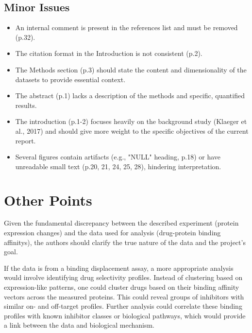 \documentclass[11pt, a4paper]{article}
\begin{document}
\subsection{Minor Issues}

\begin{itemize}
    \item An internal comment is present in the references list and must be removed (p.32).
    
    \item The citation format in the Introduction is not consistent (p.2).
    
    \item The Methods section (p.3) should state the content and dimensionality of the datasets to provide essential context.
    
    \item The abstract (p.1) lacks a description of the methods and specific, quantified results.
    
    \item The introduction (p.1-2) focuses heavily on the background study (Klaeger et al., 2017) and should give more weight to the specific objectives of the current report.
    
    \item Several figures contain artifacts (e.g., "NULL" heading, p.18) or have unreadable small text (p.20, 21, 24, 25, 28), hindering interpretation.
\end{itemize}

\section{Other Points}

Given the fundamental discrepancy between the described experiment (protein expression changes) and the data used for analysis (drug-protein binding affinitys), the authors should clarify the true nature of the data and the project's goal.

If the data is from a binding displacement assay, a more appropriate analysis would involve identifying drug selectivity profiles. Instead of clustering based on expression-like patterns, one could cluster drugs based on their binding affinity vectors across the measured proteins. This could reveal groups of inhibitors with similar on- and off-target profiles. Further analysis could correlate these binding profiles with known inhibitor classes or biological pathways, which would provide a link between the data and biological mechanism.
\end{document}
